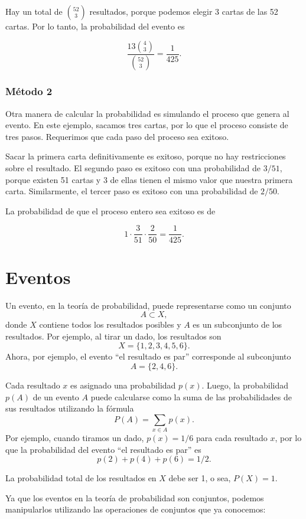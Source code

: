 Hay un total de $\binom{52}{3}$ resultados, porque podemos elegir 3 cartas
de las 52 cartas. Por lo tanto, la probabilidad del evento es

\[\frac{13 \binom{4}{3}}{\binom{52}{3}} = \frac{1}{425}.\]

\subsubsection*{Método 2}

Otra manera de calcular la probabilidad es simulando el proceso que genera
al evento. En este ejemplo, sacamos tres cartas, por lo que el proceso
consiste de tres pasos. Requerimos que cada paso del proceso sea exitoso.

Sacar la primera carta definitivamente es exitoso, porque no hay
restricciones sobre el resultado. El segundo paso es exitoso con una
probabilidad de $3/51$, porque existen 51 cartas y 3 de ellas tienen
el mismo valor que nuestra primera carta. Similarmente, el tercer paso
es exitoso con una probabilidad de $2/50$.

La probabilidad de que el proceso entero sea exitoso es de

\[1 \cdot \frac{3}{51} \cdot \frac{2}{50} = \frac{1}{425}.\]

\section{Eventos}

Un evento, en la teoría de probabilidad, puede representarse como un
conjunto \[A \subset X,\] donde $X$ contiene todos los resultados posibles
y $A$ es un subconjunto de los resultados. Por ejemplo, al tirar un dado,
los resultados son \[X = \{1,2,3,4,5,6\}.\]
Ahora, por ejemplo, el evento ``el resultado es par'' corresponde al
subconjunto \[A = \{2,4,6\}.\]

Cada resultado $x$ es asignado una probabilidad $p(x)$. Luego, la
probabilidad $p(A)$ de un evento $A$ puede calcularse como la suma de
las probabilidades de sus resultados utilizando la fórmula
\[P(A) = \sum_{x \in A} p(x).\]
Por ejemplo, cuando tiramos un dado, $p(x)=1/6$ para cada resultado $x$,
por lo que la probabilidad del evento ``el resultado es par'' es
\[p(2)+p(4)+p(6)=1/2.\]

La probabilidad total de los resultados en $X$ debe ser 1, o sea, $P(X)=1$.

Ya que los eventos en la teoría de probabilidad son conjuntos, podemos
manipularlos utilizando las operaciones de conjuntos que ya conocemos:

